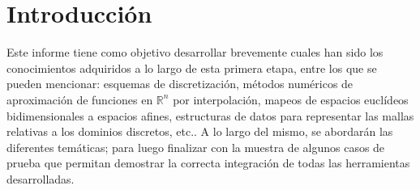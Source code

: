 
\section{Introducción}

Este informe tiene como objetivo desarrollar brevemente cuales han
sido los conocimientos adquiridos a lo largo de esta primera etapa, entre los que se pueden mencionar: esquemas de discretización, métodos
numéricos de aproximación de funciones en $\mathbb{R}^n$ por interpolación, mapeos de espacios euclídeos bidimensionales a espacios afines, estructuras de datos para representar las mallas relativas a los dominios discretos, etc.. A lo largo del mismo, se abordarán las diferentes temáticas; para luego finalizar con la muestra de algunos casos de prueba que permitan demostrar la correcta integración de todas las herramientas desarrolladas.

